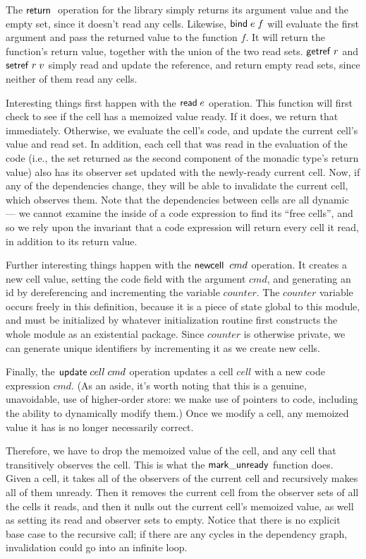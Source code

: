 The $\mathsf{return}\;$ operation for the library simply returns its argument
value and the empty set, since it doesn't read any cells. Likewise,
$\mathsf{bind}\; e\;f$ will evaluate the first argument and pass the returned
value to the function $f$. It will return the function's return value,
together with the union of the two read sets. $\mathsf{getref}\; r$ and $\mathsf{setref}\; r\;v$
simply read and update the reference, and return empty read sets, since
neither of them read any cells. 

Interesting things first happen with the $\mathsf{read}\; e$ operation. This
function will first check to see if the cell has a memoized value
ready. If it does, we return that immediately. Otherwise, we evaluate
the cell's code, and update the current cell's value and read set. In
addition, each cell that was read in the evaluation of the code (i.e.,
the set returned as the second component of the monadic type's return
value) also has its observer set updated with the newly-ready current
cell. Now, if any of the dependencies change, they will be able to
invalidate the current cell, which observes them. Note that the
dependencies between cells are all dynamic --- we cannot examine the
inside of a code expression to find its ``free cells'', and so we rely
upon the invariant that a code expression will return every cell it
read, in addition to its return value.

Further interesting things happen with the $\mathsf{newcell}\;\;cmd$
operation.  It creates a new cell value, setting the code field with
the argument $cmd$, and generating an id by dereferencing and
incrementing the variable $counter$. The $counter$ variable occurs
freely in this definition, because it is a piece of state global to
this module, and must be initialized by whatever initialization
routine first constructs the whole module as an existential package.
Since $counter$ is otherwise private, we can generate unique
identifiers by incrementing it as we create new cells. 

Finally, the $\mathsf{update}\;cell\;cmd$ operation updates a cell
$cell$ with a new code expression $cmd$. (As an aside, it's worth
noting that this is a genuine, unavoidable, use of higher-order store:
we make use of pointers to code, including the ability to dynamically
modify them.) Once we modify a cell, any memoized value it has is no
longer necessarily correct.

Therefore, we have to drop the memoized value of the cell, and any
cell that transitively observes the cell. This is what the
$\mathsf{mark\_unready}$ function does. Given a cell, it takes all of the
observers of the current cell and recursively makes all of
them unready. Then it removes the current cell from the observer sets of
all the cells it reads, and then it nulls out the current cell's
memoized value, as well as setting its read and observer sets to
empty. Notice that there is no explicit base case to the recursive
call; if there are any cycles in the dependency graph, invalidation
could go into an infinite loop. 

